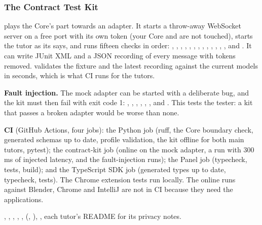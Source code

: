 \subsubsection{The Contract Test Kit}\label{sec:kit}

 plays the Core's part towards an adapter. It starts a throw-away WebSocket server on a free port with its own token (your Core and  are not touched), starts the tutor as its  says, and runs fifteen checks in order: , , , , , , , , , , , , ,  and . It can write JUnit XML and a JSON recording of every message with tokens removed.  validates the fixture and the latest recording against the current models in seconds, which is what CI runs for the tutors.

\textbf{Fault injection.} The mock adapter can be started with a deliberate bug, and the kit must then fail with exit code 1: , , , , , ,  and . This tests the tester: a kit that passes a broken adapter would be worse than none.

\textbf{CI} (GitHub Actions, four jobs): the Python job (ruff, the Core boundary check, generated schemas up to date, profile validation, the kit offline for both main tutors, pytest); the contract-kit job (online on the mock adapter, a run with 300 ms of injected latency, and the fault-injection runs); the Panel job (typecheck, tests, build); and the TypeScript SDK job (generated types up to date, typecheck, tests). The Chrome extension tests run locally. The online runs against Blender, Chrome and IntelliJ are not in CI because they need the applications.

\begin{wherebox}
, , , , ,  (, ), , each tutor's README for its privacy notes.
\end{wherebox}


